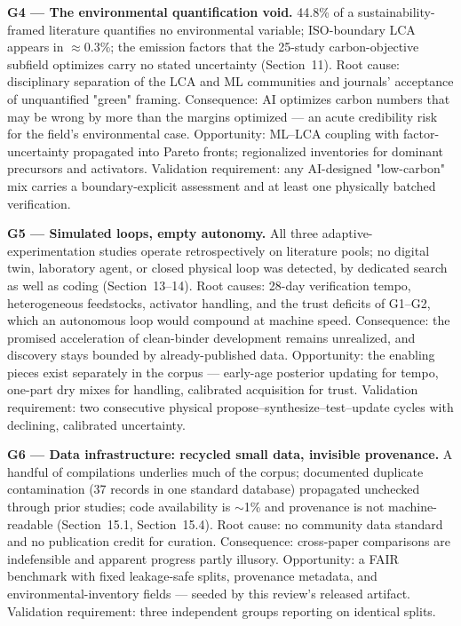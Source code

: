 \documentclass[pdflatex,sn-basic]{sn-jnl}
\begin{document}
\textbf{G4 --- The environmental quantification void.} 44.8\% of a sustainability-framed literature quantifies no environmental variable; ISO-boundary LCA appears in $\approx$0.3\%; the emission factors that the 25-study carbon-objective subfield optimizes carry no stated uncertainty (Section~11). Root cause: disciplinary separation of the LCA and ML communities and journals' acceptance of unquantified "green" framing. Consequence: AI optimizes carbon numbers that may be wrong by more than the margins optimized --- an acute credibility risk for the field's environmental case. Opportunity: ML--LCA coupling with factor-uncertainty propagated into Pareto fronts; regionalized inventories for dominant precursors and activators. Validation requirement: any AI-designed "low-carbon" mix carries a boundary-explicit assessment and at least one physically batched verification.

\textbf{G5 --- Simulated loops, empty autonomy.} All three adaptive-experimentation studies operate retrospectively on literature pools; no digital twin, laboratory agent, or closed physical loop was detected, by dedicated search as well as coding (Section~13--14). Root causes: 28-day verification tempo, heterogeneous feedstocks, activator handling, and the trust deficits of G1--G2, which an autonomous loop would compound at machine speed. Consequence: the promised acceleration of clean-binder development remains unrealized, and discovery stays bounded by already-published data. Opportunity: the enabling pieces exist separately in the corpus --- early-age posterior updating for tempo, one-part dry mixes for handling, calibrated acquisition for trust. Validation requirement: two consecutive physical propose--synthesize--test--update cycles with declining, calibrated uncertainty.

\textbf{G6 --- Data infrastructure: recycled small data, invisible provenance.} A handful of compilations underlies much of the corpus; documented duplicate contamination (37 records in one standard database) propagated unchecked through prior studies; code availability is $\sim$1\% and provenance is not machine-readable (Section~15.1, Section~15.4). Root cause: no community data standard and no publication credit for curation. Consequence: cross-paper comparisons are indefensible and apparent progress partly illusory. Opportunity: a FAIR benchmark with fixed leakage-safe splits, provenance metadata, and environmental-inventory fields --- seeded by this review's released artifact. Validation requirement: three independent groups reporting on identical splits.
\end{document}
